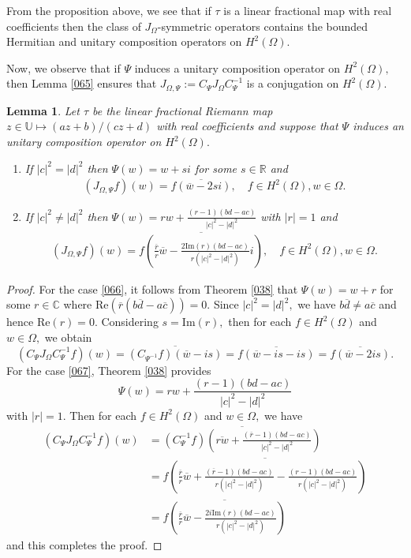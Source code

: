 \documentclass[11pt]{amsart}%
\newtheorem{lem}[thm]{Lemma}
\theoremstyle{definition}
\theoremstyle{remark}
\numberwithin{equation}{section}
\begin{document}
From the proposition above, we see that if $\tau$ is a linear fractional map with real coefficients then the class of
$J_{\Omega}$-symmetric operators contains the bounded Hermitian and unitary
composition operators on $H^{2}(\Omega).$

Now, we observe that if $\Psi$ induces a unitary composition operator on
$H^{2}(\Omega),$ then Lemma \ref{065} ensures that $J_{\Omega,\Psi}:=C_{\Psi
}J_{\Omega}C_{\Psi}^{-1}$ is a conjugation on $H^{2}(\Omega).$

\begin{lem}
\label{098}  Let $\tau$ be the linear fractional Riemann map $z\in \mathbb{U} \mapsto (az+b)/(cz+d)$ with real coefficients and suppose that $\Psi$ induces an unitary composition
operator on $H^{2}(\Omega).$

\begin{enumerate}
\item \label{066} If $|c|^{2}=|d|^{2}$ then $\Psi(w)=w+si$ for some
$s\in\mathbb{R}$ and
\begin{align*}
(J_{\Omega, \Psi}f)(w)=\overline{f(\overline{w}-2si)}, \quad f\in H^{2}%
(\Omega),w\in\Omega.
\end{align*}


\item \label{067} If $|c|^{2}\neq|d|^{2}$ then $\Psi(w)=r w+\frac
{(r-1)(bd-ac)}{|c|^{2}-|d|^{2}}$ with $|r|=1$ and
\begin{align*}
(J_{\Omega, \Psi} f)(w)=\overline{f\left(  \frac{\overline{r}}{r}\overline
{w}-\frac{2\mathrm{Im}(r)(bd-ac)}{r(|c|^{2}-|d|^{2})}i\right)  }, \quad f\in
H^{2}(\Omega),w\in\Omega.
\end{align*}

\end{enumerate}
\end{lem}

\begin{proof}
For the case \eqref{066}, it follows from Theorem \ref{038} that $\Psi(w)=w+r$ for
some $r\in\mathbb{C}$ where $\mathrm{Re}(\overline{r}(b\overline{d}%
-a\overline{c}))=0.$ Since $|c|^{2}=|d|^{2},$ we have $b\overline
{d}\neq a\overline{c}$ and hence $\mathrm{Re}(r)=0.$ Considering $s=\mathrm{Im}(r),$
then for each $f\in H^{2}(\Omega)$ and $w\in\Omega,$ we obtain
\[
(C_{\Psi}J_{\Omega}C_{\Psi}^{-1}f)(w)=\overline{(C_{\Psi^{-1}}f)(\overline
{w}-is)}=\overline{f(\overline{w}-is-is)}=\overline{f(\overline{w}-2is)}.
\]
For the case \eqref{067}, Theorem \ref{038} provides
\[
\Psi(w)=rw+\frac{(r-1)(bd-ac)}{|c|^{2}-|d|^{2}}%
\]
with $|r|=1.$ Then for each $f\in H^{2}(\Omega)$ and $w\in\Omega,$ we have
\begin{align*}
(C_{\Psi}J_{\Omega}C_{\Psi}^{-1}f)(w)  &  =\overline{(C_{\Psi}^{-1}f)\left(
\overline{rw}+\frac{(\overline{r}-1)(bd-ac)}{|c|^{2}-|d|^{2}}\right)  }\\
&  =\overline{f\left(  \frac{\overline{r}}{r}\overline{w}+\frac{(\overline
{r}-1)(bd-ac)}{r(|c|^{2}-|d|^{2})}-\frac{(r-1)(bd-ac)}{r(|c|^{2}-|d|^{2}%
)}\right)  }\\
&  =\overline{f\left(  \frac{\overline{r}}{r}\overline{w}-\frac{2i\mathrm{Im}%
(r)(bd-ac)}{r(|c|^{2}-|d|^{2})}\right)  }%
\end{align*}
and this completes the proof.
\end{proof}
\end{document}
